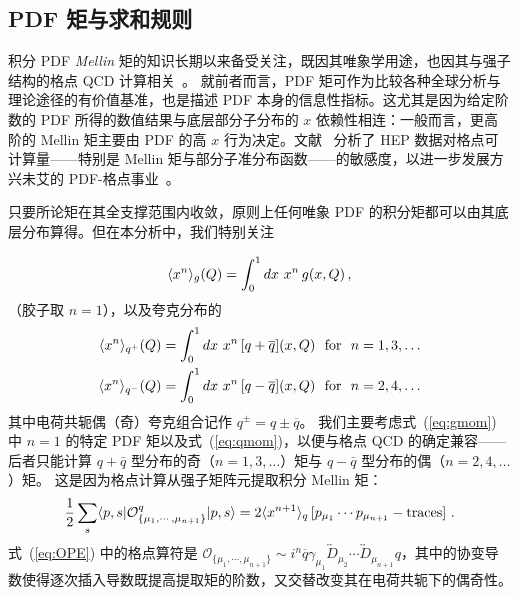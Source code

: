 \clearpage


\subsection{PDF 矩与求和规则}
\label{sec:moments}

积分 PDF {\it Mellin} 矩的知识长期以来备受关注，既因其唯象学用途，也因其与强子结构的格点 QCD 计算相关~\cite{Lin:2017snn,Hobbs:2019gob,Lin:2020rut}。
就前者而言，PDF 矩可作为比较各种全球分析与理论途径的有价值基准，也是描述 PDF 本身的信息性指标。这尤其是因为给定阶数的 PDF 所得的数值结果与底层部分子分布的 $x$ 依赖性相连：一般而言，更高阶的 Mellin 矩主要由 PDF 的高 $x$ 行为决定。文献~\cite{Hobbs:2019gob} 分析了 HEP 数据对格点可计算量——特别是 Mellin 矩与部分子准分布函数——的敏感度，以进一步发展方兴未艾的 PDF-格点事业~\cite{Lin:2017snn,Lin:2020rut}。

只要所论矩在其全支撑范围内收敛，原则上任何唯象 PDF 的积分矩都可以由其底层分布算得。但在本分析中，我们特别关注

\begin{equation}
\langle x^n\rangle_g(Q)=\int_{0}^{1}dx\ x^{n}\,  g(x,\Q) \, ,
\label{eq:gmom}
\end{equation}
（胶子取 $n\!=\!1$），以及夸克分布的
\begin{align}
	\langle x^n\rangle_{q^+}(Q) &= \int_{0}^{1}dx\ x^{n}\,  [q + \overline{q}](x,Q) \ \ \mathrm{for}\ \ n = 1, 3, \dots \nonumber \\
	\langle x^n\rangle_{q^-}(Q) &= \int_{0}^{1}dx\ x^{n}\,  [q - \overline{q}](x,Q) \ \ \mathrm{for}\ \ n = 2, 4, \dots
\label{eq:qmom}
\end{align}
其中电荷共轭偶（奇）夸克组合记作 $q^\pm = q \pm \overline{q}$。
我们主要考虑式~(\ref{eq:gmom}) 中 $n\!=\!1$ 的特定 PDF 矩以及式~(\ref{eq:qmom})，以便与格点 QCD 的确定兼容——后者只能计算 $q\!+\!\bar{q}$ 型分布的奇（$n\! =\! 1, 3, \dots$）矩与 $q\!-\!\bar{q}$ 型分布的偶（$n\! =\! 2, 4, \dots$）矩。
这是因为格点计算从强子矩阵元提取积分 Mellin 矩：
\begin{equation}
	\frac{1}{2}\sum_{s}\langle p,s|\mathcal{O}_{\{\mu_{1},\cdots,\mu_{n+1}\}}^{q}|p,s\rangle = 2 \langle x^{n+1} \rangle_{q}\,[p_{\mu_{1}}\cdots p_{\mu_{n+1}}-{\rm traces}]\ .
\label{eq:OPE}
\end{equation}
式~(\ref{eq:OPE}) 中的格点算符是
$\mathcal{O}_{\{\mu_{1},\cdots,\mu_{n+1}\}}\! \sim\! i^n \overline{q} \gamma_{\mu_1} \overleftrightarrow{D}_{\mu_2} \cdots \overleftrightarrow{D}_{\mu_{n+1}} q$，其中的协变导数使得逐次插入导数既提高提取矩的阶数，又交替改变其在电荷共轭下的偶奇性。


